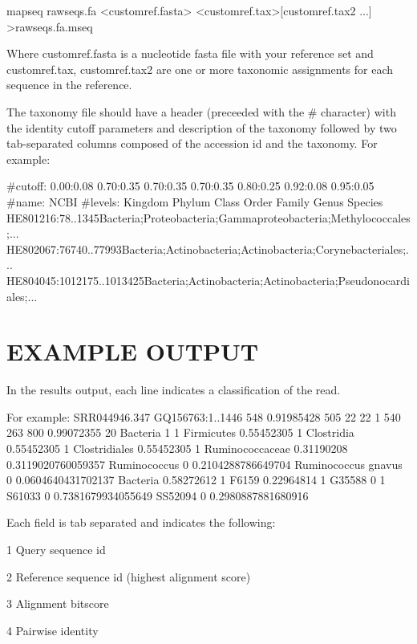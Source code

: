 \documentclass[10pt,a4paper]{article}
\begin{document}
mapseq rawseqs.fa {\textless}customref.fasta{\textgreater} {\textless}customref.tax\textgreater [customref.tax2 ...] \textgreater rawseqs.fa.mseq

Where customref.fasta is a nucleotide fasta file with your reference set and customref.tax, customref.tax2 are one or more taxonomic assignments for each sequence in the reference.

The taxonomy file should have a header (preceeded with the \# character) with the identity cutoff parameters and description of the taxonomy followed by two tab-separated columns composed of the accession id and the taxonomy. For example:

\#cutoff: 0.00:0.08 0.70:0.35 0.70:0.35 0.70:0.35 0.80:0.25 0.92:0.08 0.95:0.05
\#name: NCBI
\#levels: Kingdom Phylum Class Order Family Genus Species
HE801216:78..1345{\tab}Bacteria;Proteobacteria;Gammaproteobacteria;Methylococcales;...
HE802067:76740..77993{\tab}Bacteria;Actinobacteria;Actinobacteria;Corynebacteriales;...
HE804045:1012175..1013425{\tab}Bacteria;Actinobacteria;Actinobacteria;Pseudonocardiales;...



\section{EXAMPLE OUTPUT}

In the results output, each line indicates a classification of the read.

For example:
SRR044946.347   GQ156763:1..1446        548     0.91985428      505     22      22      1       540     263     800     0.99072355      20              Bacteria        1       1       Firmicutes      0.55452305      1       Clostridia      0.55452305      1       Clostridiales   0.55452305      1       Ruminococcaceae 0.31190208      0.3119020760059357      Ruminococcus    0       0.2104288786649704      Ruminococcus gnavus     0       0.0604640431702137              Bacteria        0.58272612      1       F6159   0.22964814      1       G35588  0       1       S61033  0       0.7381679934055649      SS52094 0       0.2980887881680916

Each field is tab separated and indicates the following:

1       Query sequence id

2       Reference sequence id (highest alignment score)

3       Alignment bitscore

4       Pairwise identity
\end{document}
